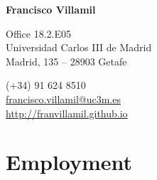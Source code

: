 \documentclass[a4paper, 12pt]{article}
\begin{document}

\begin{center}
{\bfseries\Large Francisco Villamil}
\end{center}

\vspace{10pt}

\noindent
\begin{minipage}[t]{0.47\textwidth}\small
\flushright
	Office 18.2.E05\\
	Universidad Carlos III de Madrid\\
	Madrid, 135 -- 28903 Getafe\\
\end{minipage}\hfill
\begin{minipage}[t]{0.47\textwidth}\small
   \hspace{5pt} (+34) 91 624 8510\\
	 \hspace{5pt} \href{mailto:francisco.villamil@uc3m.es}{francisco.villamil@uc3m.es}\\
	 \hspace{5pt} \href{http://franvillamil.github.io}{http://franvillamil.github.io}\\
\end{minipage}

\section*{Employment}
\end{document}

